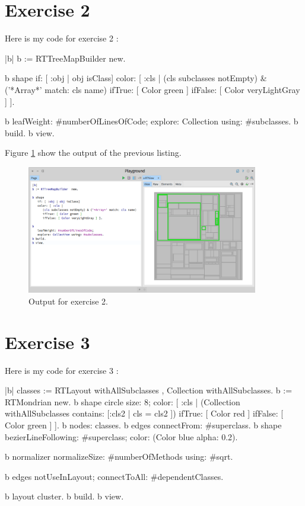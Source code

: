 \documentclass[a4paper,11pt]{report}
\begin{document}
\section*{Exercise 2}

Here is my code for exercise 2 :

\begin{smalltalkcode}
|b|
b := RTTreeMapBuilder  new.

b shape
  if: [ :obj | obj isClass]
  color: [ :cls |
    (cls subclasses notEmpty) & ('*Array*' match: cls name) 
    ifTrue: [ Color green ]
    ifFalse: [ Color veryLightGray ] ].

b leafWeight: #numberOfLinesOfCode;
  explore: Collection using: #subclasses.
b build.
b view.
\end{smalltalkcode}

Figure \ref{fig:ex2} show the output of the previous listing.

\begin{figure}[h]
  \centering
  \includegraphics[width=0.9\textwidth]{ex2.png}
  \caption{Output for exercise 2.}
  \label{fig:ex2}
\end{figure}

\newpage

\section*{Exercise 3}

Here is my code for exercise 3 :

\begin{smalltalkcode}
|b|
classes := RTLayout withAllSubclasses , Collection withAllSubclasses.
b := RTMondrian new.
b shape circle
      size: 8;
      color: [ :cls |
        (Collection withAllSubclasses contains: [:cls2 | cls = cls2 ])
          ifTrue: [ Color red ]
          ifFalse: [ Color green ] ].
b nodes: classes.
b edges connectFrom: #superclass.
b shape
  bezierLineFollowing: #superclass;
  color: (Color blue alpha: 0.2).

b normalizer
  normalizeSize: #numberOfMethods using: #sqrt.

b edges
  notUseInLayout;
  connectToAll: #dependentClasses.

b layout cluster.
b build.
b view.
\end{smalltalkcode}
\end{document}
